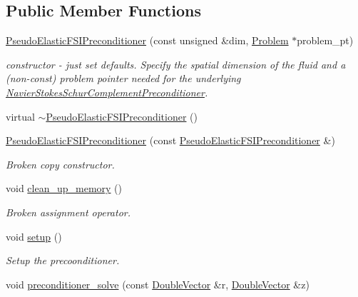 \subsection*{Public Member Functions}
\begin{DoxyCompactItemize}
\item 
\hyperlink{classoomph_1_1PseudoElasticFSIPreconditioner_aa3132ef3e4ecd57adf64da72e84b5d9d}{Pseudo\+Elastic\+F\+S\+I\+Preconditioner} (const unsigned \&dim, \hyperlink{classoomph_1_1Problem}{Problem} $\ast$problem\+\_\+pt)
\begin{DoxyCompactList}\small\item\em constructor -\/ just set defaults. Specify the spatial dimension of the fluid and a (non-\/const) problem pointer needed for the underlying \hyperlink{classoomph_1_1NavierStokesSchurComplementPreconditioner}{Navier\+Stokes\+Schur\+Complement\+Preconditioner}. \end{DoxyCompactList}\item 
virtual \hyperlink{classoomph_1_1PseudoElasticFSIPreconditioner_a8f57b2dc7f9e37d419ead6b786dfac82}{$\sim$\+Pseudo\+Elastic\+F\+S\+I\+Preconditioner} ()
\item 
\hyperlink{classoomph_1_1PseudoElasticFSIPreconditioner_aa7efe57119bf77e503049922f8d16722}{Pseudo\+Elastic\+F\+S\+I\+Preconditioner} (const \hyperlink{classoomph_1_1PseudoElasticFSIPreconditioner}{Pseudo\+Elastic\+F\+S\+I\+Preconditioner} \&)
\begin{DoxyCompactList}\small\item\em Broken copy constructor. \end{DoxyCompactList}\item 
void \hyperlink{classoomph_1_1PseudoElasticFSIPreconditioner_a15859381010faa40a47fdca28b281475}{clean\+\_\+up\+\_\+memory} ()
\begin{DoxyCompactList}\small\item\em Broken assignment operator. \end{DoxyCompactList}\item 
void \hyperlink{classoomph_1_1PseudoElasticFSIPreconditioner_a460ad5eea59f4c07dfde8b11696fabb1}{setup} ()
\begin{DoxyCompactList}\small\item\em Setup the precoonditioner. \end{DoxyCompactList}\item 
void \hyperlink{classoomph_1_1PseudoElasticFSIPreconditioner_ad29c2852949caec2d20cbe7cf99f1b38}{preconditioner\+\_\+solve} (const \hyperlink{classoomph_1_1DoubleVector}{Double\+Vector} \&r, \hyperlink{classoomph_1_1DoubleVector}{Double\+Vector} \&z)

\end{DoxyCompactItemize}
